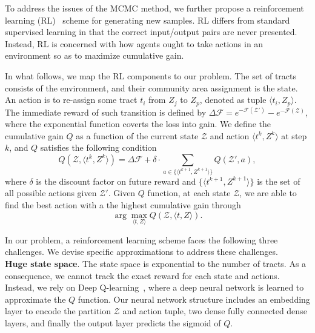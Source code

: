 To address the issues of the MCMC method, we further propose a reinforcement learning (RL)~\cite{sutton1998reinforcement} scheme for generating new samples. RL differs from standard supervised learning in that the correct input/output pairs are never presented. Instead, RL is concerned with how agents ought to take actions in an environment so as to maximize cumulative gain.

In what follows, we map the RL components to our problem. The set of tracts consists of the environment, and their community area assignment is the state. An action is to re-assign some tract $t_i$ from $Z_j$ to $Z_p$, denoted as tuple $\langle t_i, Z_p\rangle$. The immediate reward of such transition is defined by $\Delta \mathcal{F} = e^{-\mathcal{F}(\mathcal{Z}')} - e^{ -\mathcal{F}(\mathcal{Z})}$, where the exponential function coverts the loss into gain. We define the cumulative gain $Q$ as a function of the current state $\mathcal{Z}$ and action $\langle t^k, Z^k \rangle$ at step $k$, and $Q$ satisfies the following condition
\begin{equation}
\label{eq:Q-obj}
Q(\mathcal{Z}, \langle t^k, Z^k \rangle) = \Delta \mathcal{F} + \delta \cdot \sum_{a \in \{\langle t^{k+1}, Z^{k+1} \rangle\}} Q(\mathcal{Z}', a),
\end{equation}
where $\delta$ is the discount factor on future reward and $\{\langle t^{k+1}, Z^{k+1} \rangle\}$ is the set of all possible actions given $\mathcal{Z}'$. Given $Q$ function, at each state $\mathcal{Z}$, we are able to find the best action with a the highest cumulative gain through
\begin{equation}
\label{eq:Q-policy}
\arg\max_{\langle t, Z \rangle} Q(\mathcal{Z}, \langle t, Z \rangle).
\end{equation}


In our problem, a reinforcement learning scheme faces the following three challenges. We devise specific approximations to address these challenges. \\

\textbf{Huge state space}. The state space is exponential to the number of tracts. As a consequence, we cannot track the exact reward for each state and actions. Instead, we rely on Deep Q-learning~\cite{van2016deep}, where a deep neural network is learned to approximate the $Q$ function. Our neural network structure includes an embedding layer to encode the partition $\mathcal{Z}$ and action tuple, two dense fully connected dense layers, and finally the output layer predicts the sigmoid of $Q$.

